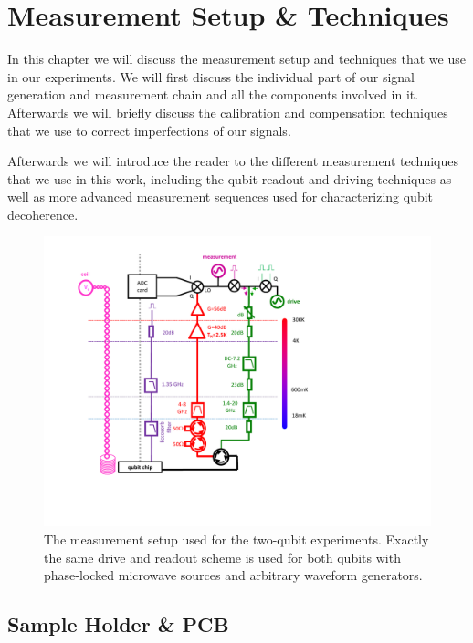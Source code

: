 \chapter{Measurement Setup \& Techniques}

In this chapter we will discuss the measurement setup and techniques that we use in our experiments. We will first discuss the individual part of our signal generation and measurement chain and all the components involved in it. Afterwards we will briefly discuss the calibration and compensation techniques that we use to correct imperfections of our signals.

Afterwards we will introduce the reader to the different measurement techniques that we use in this work, including the qubit readout and driving techniques as well as more advanced measurement sequences used for characterizing qubit decoherence.

\begin{figure}[ht!]
	\centering
		\includegraphics[width=1.\textwidth]{"./material/figures/2-qubit-processor/measurement setup"}
	\caption[The measurement setup used for the two-qubit experiments]{The measurement setup used for the two-qubit experiments. Exactly the same drive and readout scheme is used for both qubits with phase-locked microwave sources and arbitrary waveform generators.}
	\label{fig:MeasurementSetup}
\end{figure}

\section{Sample Holder \& PCB}

